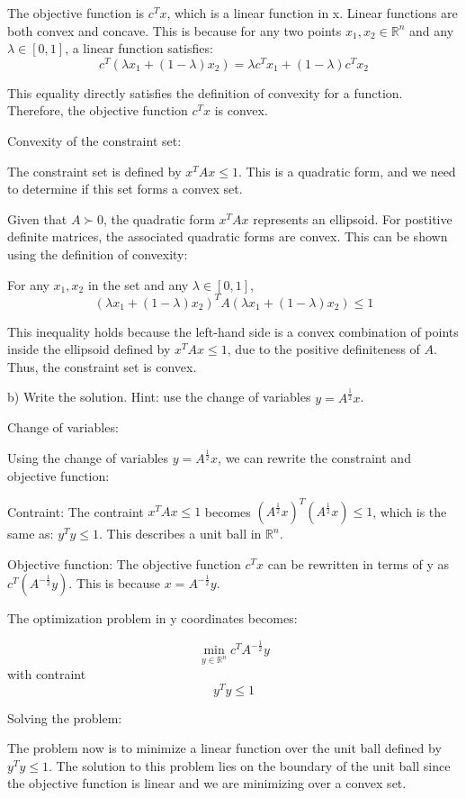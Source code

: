 \documentclass{article}
\newcommand{\RR}{\mathbb{R}}
\begin{document}
The objective function is $c^T x$, which is a linear function in x. Linear
functions are both convex and concave. This is because for any two points
$x_1, x_2 \in \RR^n$ and any $\lambda \in [0, 1]$, a linear function
satisfies:
\[c^T (\lambda x_1 + (1-\lambda)x_2) = \lambda c^T x_1 + (1-\lambda) c^T x_2\]

This equality directly satisfies the definition of convexity for a function. Therefore,
the objective function $c^T x$ is convex.

Convexity of the constraint set:

The constraint set is defined by $x^T A x \leq 1$. This is a quadratic
form, and we need to determine if this set forms a convex set.

Given that $A \succ 0$, the quadratic form $x^T A x$ represents an ellipsoid.
For postitive definite matrices, the associated quadratic forms are convex.
This can be shown using the definition of convexity:

For any $x_1, x_2$ in the set and any $\lambda \in [0, 1]$,
\[(\lambda x_1 + (1-\lambda)x_2)^T A (\lambda x_1 + (1-\lambda)x_2) \leq 1\]

This inequality holds because the left-hand side is a convex combination
of points inside the ellipsoid defined by $x^T A x \leq 1$, due to the positive
definiteness of $A$. Thus, the constraint set is convex.


b) Write the solution. Hint: use the change of variables
$y = A^{\frac{1}{2}} x$.

Change of variables:

Using the change of variables $y = A^{\frac{1}{2}} x$, we can
rewrite the constraint and objective function:

Contraint: The contraint $x^T A x \leq 1$ becomes
$(A^{\frac{1}{2}} x)^T (A^{\frac{1}{2}} x) \leq 1$, which is the same as:
$y^T y \leq 1$. This describes a unit ball in $\RR^n$.

Objective function: The objective function $c^T x$ can be rewritten
in terms of y as $c^T (A^{-\frac{1}{2}} y)$. This is because
$x = A^{-\frac{1}{2}} y$.

The optimization problem in y coordinates becomes:

\[\min_{y \in \RR^n} c^T A^{-\frac{1}{2}} y\]
with contraint
\[y^T y \leq 1\]

Solving the problem:

The problem now is to minimize a linear function over the unit ball defined
by $y^T y \leq 1$. The solution to this problem lies on the boundary
of the unit ball since the objective function is linear
and we are minimizing over a convex set.
\end{document}
